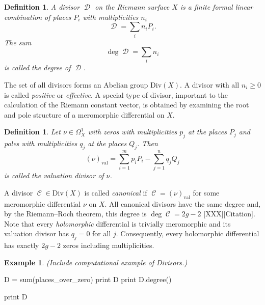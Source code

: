 \documentclass[12pt]{article}
\newtheorem{definition}[theorem]{Definition}
\theoremstyle{definition}
\newtheorem{example}[theorem]{Example}
\DeclareMathOperator{\DivC}{\mathcal{C}}
\DeclareMathOperator{\DivD}{\mathcal{D}}
\begin{document}
\begin{definition} \label{def:divisor}
A divisor $\DivD$ on the Riemann surface $X$ is a finite formal linear
combination of places $P_i$ with multiplicities $n_i$
\[
\DivD = \sum_i n_i P_i.
\]
The sum
\[
\deg \DivD = \sum_i n_i
\]
is called the degree of $\DivD$.
\end{definition}
The set of all divisors forms an Abelian group $\text{Div}(X)$. A
divisor with all $n_i \geq 0$ is called {\it positive} or {\it
  effective}. A special type of divisor, important to the calculation of
the Riemann constant vector, is obtained by examining the root and pole
structure of a meromorphic differential on $X$.
\begin{definition} \label{def:valuationdivisor}
Let $\nu \in \Omega_X^1$ with zeros with multiplicities $p_j$ at the
places $P_j$ and poles with multiplicities $q_j$ at the places
$Q_j$. Then
\begin{equation} \label{eqn: valuation divisor}
  (\nu)_\text{val} = \sum_{i=1}^m p_iP_i - \sum_{j=1}^n q_jQ_j
\end{equation}
is called the valuation divisor of $\nu$.
\end{definition}
A divisor $\DivC \in \text{Div}(X)$ is called {\it canonical} if $\DivC
= (\nu)_\text{val}$ for some meromorphic differential $\nu$ on $X$. All
canonical divisors have the same degree and, by the Riemann--Roch
theorem, this degree is $\deg \DivC = 2g - 2$ [XXX][Citation]. Note that
every {\it holomorphic} differential is trivially meromorphic and its
valuation divisor has $q_j = 0$ for all $j$. Consequently, every
holomorphic differential has exactly $2g-2$ zeros including
multiplicities.


\begin{example}
  {\it (Include computational example of Divisors.)}
\begin{ipythoninput}
D = sum(places_over_zero)
print D
print D.degree()
\end{ipythoninput}
\begin{ipythonoutput}
[XXX]
\end{ipythonoutput}
\begin{ipythoninput}
print D
\end{ipythoninput}
\begin{ipythonoutput}
[XXX]
\end{ipythonoutput}

\end{example}


\end{document}

